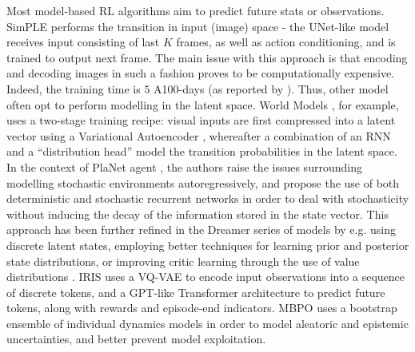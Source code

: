 \documentclass[en]{pracamgr}
\begin{document}
Most model-based RL algorithms aim to predict future stats or observations. SimPLE \autocite{kaiserModelBasedReinforcementLearning2024} performs the transition in input (image) space - the UNet-like model receives input consisting of last $K$ frames, as well as action conditioning, and is trained to output next frame. The main issue with this approach is that encoding and decoding images in such a fashion proves to be computationally expensive. Indeed, the training time is $5$ A100-days (as reported by \autocite{hafnerMasteringDiverseDomains2024}). Thus, other model often opt to perform modelling in the latent space. World Models \autocite{haRecurrentWorldModels2018}, for example, uses a two-stage training recipe: visual inputs are first compressed into a latent vector using a Variational Autoencoder \autocite{kingmaAutoEncodingVariationalBayes2022}, whereafter a combination of an RNN and a ``distribution head'' model the transition probabilities in the latent space. In the context of PlaNet agent \autocite{hafnerLearningLatentDynamics2019}, the authors raise the issues surrounding modelling stochastic environments autoregressively, and propose the use of both deterministic and stochastic recurrent networks in order to deal with stochasticity without inducing the decay of the information stored in the state vector. This approach has been further refined in the Dreamer series of models \autocite{hafnerDreamControlLearning2020,hafnerMasteringAtariDiscrete2022,hafnerMasteringDiverseDomains2024} by e.g. using discrete latent states, employing better techniques for learning prior and posterior state distributions, or improving critic learning through the use of value distributions \autocite{bellemareDistributionalPerspectiveReinforcement2017}. IRIS \autocite{micheliTransformersAreSampleEfficient2023} uses a VQ-VAE \autocite{oordNeuralDiscreteRepresentation2018} to encode input observations into a sequence of discrete tokens, and a GPT-like Transformer architecture \autocite{vaswaniAttentionAllYou2017} to predict future tokens, along with rewards and episode-end indicators. MBPO \autocite{jannerWhenTrustYour2021} uses a bootstrap ensemble of individual dynamics models in order to model aleatoric and epistemic uncertainties, and better prevent model exploitation.
\end{document}
